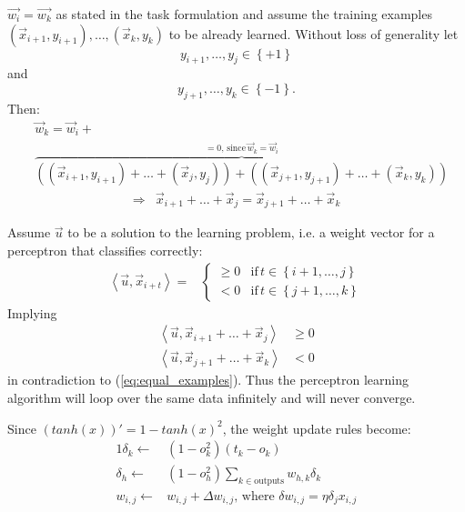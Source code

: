 \documentclass[10pt,a4paper,boxed]{hmcpset}
\begin{document}
	
		\begin{problem}
		\end{problem}
		\begin{solution}
			$\vec{w_i}=\vec{w_k}$ as stated in the task formulation and assume the training examples $\left(\vec{x}_{i+1},y_{i+1}\right),\ldots,\left(\vec{x}_{k},y_{k}\right)$ to be already learned. Without loss of generality let 
			\[y_{i+1},\ldots,y_{j} \in \left\{ +1 \right\}\] and \[y_{j+1},\ldots,y_{k} \in \left\{ -1 \right\}.\] Then:
			\begin{align*}
				& \vec{w}_k = \vec{w}_i + \\
				& \overbrace{\left( (\vec{x}_{i+1}, y_{i+1}) + \ldots + (\vec{x}_{j}, y_{j}) \right) + \left( (\vec{x}_{j+1},y_{j+1}) + \ldots + (\vec{x}_{k}, y_{k}) \right)}^{=0,\,\textrm{since}\, \vec{w}_k = \vec{w}_i}
			\end{align*}
			\begin{align}
				\Rightarrow & \vec{x}_{i+1} + \ldots + \vec{x}_{j} = \vec{x}_{j+1} + \ldots + \vec{x}_{k} \label{eq:equal_examples}
			\end{align}
			
			Assume $\vec{u}$ to be a solution to the learning problem, i.e. a weight vector for a perceptron that classifies correctly:
			\begin{align*}
				\left\langle \vec{u},\vec{x}_{i+t}\right\rangle = & \begin{cases}
																		\geq0 & \textrm{if}\,t\in\left\{ i+1,\ldots,j\right\} \\
																		   <0 & \textrm{if}\,t\in\left\{ j+1,\ldots,k\right\} 
																	\end{cases}
			\end{align*}
			Implying
			\begin{align*}
				\left\langle \vec{u},\vec{x}_{i+1} + \ldots + \vec{x}_{j}\right\rangle & \geq0 \\
				\left\langle \vec{u},\vec{x}_{j+1} + \ldots + \vec{x}_{k}\right\rangle & < 0
			\end{align*}
			in contradiction to (\ref{eq:equal_examples}). Thus the perceptron learning algorithm will loop over the same data infinitely and will never converge.
			
			
		\end{solution}		

		\begin{problem}
		\end{problem}
		\begin{solution}
			Since $(tanh(x))' = 1-tanh(x)^2$, the weight update rules become:
			\begin{alignat*}{1}
				\delta_k \leftarrow & \left( 1-o_k^2 \right) \left( t_k - o_k \right) \\
				\delta_h \leftarrow & \left( 1-o_h^2 \right) \sum_{k \in \textrm{outputs}} w_{h,k} \delta_k \\
				w_{i,j} \leftarrow & w_{i,j} + \Delta w_{i,j},\,\mbox{where } \delta w_{i,j} = \eta \delta_j x_{i,j}
			\end{alignat*}
		\end{solution}		
\end{document}
